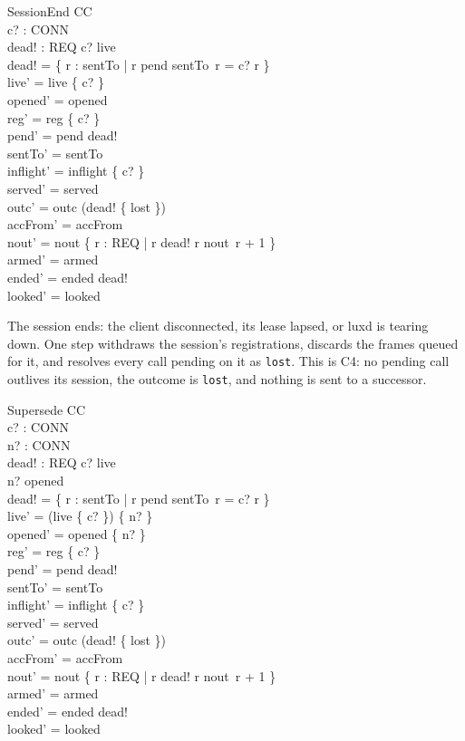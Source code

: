 \documentclass[a4paper,10pt,fleqn]{article}
\begin{document}
\begin{schema}{SessionEnd}
  \Delta CC \\
  c? : CONN \\
  dead! : \power REQ
\where
  c? \in live \\
  dead! = \{ r : \dom sentTo | r \in pend \land sentTo~r = c? \spot r \} \\
  live' = live \setminus \{ c? \} \\
  opened' = opened \\
  reg' = reg \nrres \{ c? \} \\
  pend' = pend \setminus dead! \\
  sentTo' = sentTo \\
  inflight' = inflight \nrres \{ c? \} \\
  served' = served \\
  outc' = outc \oplus (dead! \cross \{ lost \}) \\
  accFrom' = accFrom \\
  nout' = nout \oplus
    \{ r : REQ | r \in dead! \spot r \mapsto nout~r + 1 \} \\
  armed' = armed \\
  ended' = ended \cup dead! \\
  looked' = looked
\end{schema}

The session ends: the client disconnected, its lease lapsed, or luxd is
tearing down.  One step withdraws the session's registrations, discards the
frames queued for it, and resolves every call pending on it as
\texttt{lost}.  This is C4: no pending call outlives its session, the outcome
is \texttt{lost}, and nothing is sent to a successor.

\begin{schema}{Supersede}
  \Delta CC \\
  c? : CONN \\
  n? : CONN \\
  dead! : \power REQ
\where
  c? \in live \\
  n? \notin opened \\
  dead! = \{ r : \dom sentTo | r \in pend \land sentTo~r = c? \spot r \} \\
  live' = (live \setminus \{ c? \}) \cup \{ n? \} \\
  opened' = opened \cup \{ n? \} \\
  reg' = reg \nrres \{ c? \} \\
  pend' = pend \setminus dead! \\
  sentTo' = sentTo \\
  inflight' = inflight \nrres \{ c? \} \\
  served' = served \\
  outc' = outc \oplus (dead! \cross \{ lost \}) \\
  accFrom' = accFrom \\
  nout' = nout \oplus
    \{ r : REQ | r \in dead! \spot r \mapsto nout~r + 1 \} \\
  armed' = armed \\
  ended' = ended \cup dead! \\
  looked' = looked
\end{schema}
\end{document}
